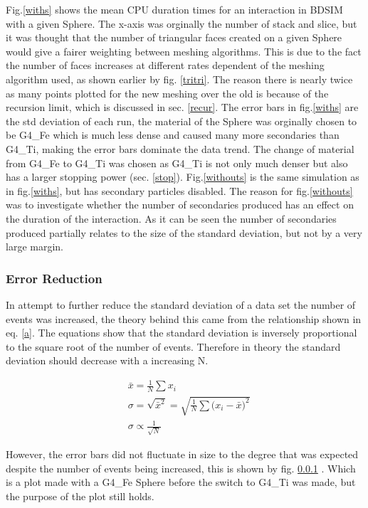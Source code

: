 \documentclass[12pt,a4paper]{article}
\begin{document}
\noindent Fig.\ref{withs} shows the mean CPU duration times for an interaction in BDSIM with a given Sphere. The x-axis was orginally the number of stack and slice, but it was thought that the number of triangular faces created on a given Sphere would give a fairer weighting between meshing algorithms. This is due to the fact the number of faces increases at different rates dependent of the meshing algorithm used, as shown earlier by fig. \ref{tritri}. The reason there is nearly twice as many points plotted for the new meshing over the old is because of the recursion limit, which is discussed in sec. \ref{recur}. The error bars in fig.\ref{withs} are the std deviation of each run, the material of the Sphere was orginally chosen to be G4\_Fe which is much less dense and caused many more secondaries than G4\_Ti, making the error bars dominate the data trend. The change of material from G4\_Fe to G4\_Ti was chosen as G4\_Ti is not only much denser but also has a larger stopping power (sec. \ref{stop}). Fig.\ref{withouts} is the same simulation as in fig.\ref{withs}, but has secondary particles disabled. The reason for fig.\ref{withouts} was to investigate whether the number of secondaries produced has an effect on the duration of the interaction. As it can be seen the number of secondaries produced partially relates to the size of the standard deviation, but not by a very large margin.

\newpage
\subsubsection{Error Reduction}
\label{err}
\noindent In attempt to further reduce the standard deviation of a data set the number of events was increased, the theory behind this came from the relationship shown in eq. \ref{a}. The equations show that the standard deviation is inversely proportional to the square root of the number of events. Therefore in theory the standard deviation should decrease with a increasing N.

\begin{equation}
\begin{aligned}
& \bar{x} = \frac{1}{N}\sum{x_i}\\
& \sigma = \sqrt{\bar{x}^2} = \sqrt{\frac{1}{N}\sum{(x_i - \bar{x}})^2}\\
& \sigma \propto \frac{1}{\sqrt{N}} 
\end{aligned}
\label{a}
\end{equation}

\noindent However, the error bars did not fluctuate in size to the degree that was expected despite the number of events being increased, this is shown by fig. \ref{err} . Which is a plot made with a G4\_Fe Sphere before the switch to G4\_Ti was made, but the purpose of the plot still holds. 
\end{document}

